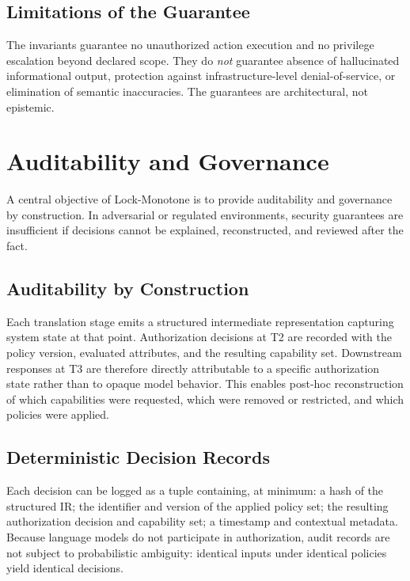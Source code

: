 \documentclass[conference]{IEEEtran}
\begin{document}
\subsection{Limitations of the Guarantee}
The invariants guarantee no unauthorized action execution and no privilege
escalation beyond declared scope. They do \emph{not} guarantee absence of
hallucinated informational output, protection against
infrastructure-level denial-of-service, or elimination of semantic
inaccuracies. The guarantees are architectural, not epistemic.

\section{Auditability and Governance}
\label{sec:audit}

A central objective of Lock-Monotone is to provide auditability and
governance by construction. In adversarial or regulated environments,
security guarantees are insufficient if decisions cannot be explained,
reconstructed, and reviewed after the fact.

\subsection{Auditability by Construction}
Each translation stage emits a structured intermediate representation
capturing system state at that point. Authorization decisions at T2 are
recorded with the policy version, evaluated attributes, and the resulting
capability set. Downstream responses at T3 are therefore directly
attributable to a specific authorization state rather than to opaque model
behavior. This enables post-hoc reconstruction of which capabilities were
requested, which were removed or restricted, and which policies were
applied.

\subsection{Deterministic Decision Records}
Each decision can be logged as a tuple containing, at minimum: a hash of
the structured IR; the identifier and version of the applied policy set;
the resulting authorization decision and capability set; a timestamp and
contextual metadata. Because language models do not participate in
authorization, audit records are not subject to probabilistic ambiguity:
identical inputs under identical policies yield identical decisions.
\end{document}
